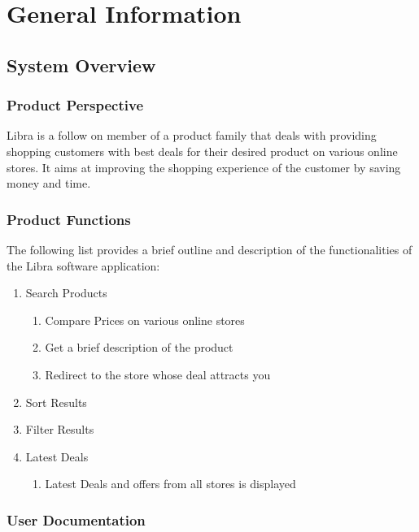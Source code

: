 \chapter{General Information}


\section{System Overview}

\subsection{Product Perspective}

Libra is a follow on member of a product family that deals with providing shopping customers with best deals for their desired product on various online stores. It aims at improving the shopping experience of the customer by saving money and time.

\subsection{Product Functions}

The following list provides a brief outline and description of the functionalities of the Libra software application:
\begin{enumerate}
     \item Search Products
     \begin{enumerate}
    	\item Compare Prices on various online stores
     	\item Get a brief description of the product
     	\item Redirect to the store whose deal attracts you
     \end{enumerate}
     \item Sort Results
     \item Filter Results
     \item Latest Deals
     \begin{enumerate}
    	\item Latest Deals and offers from all stores is displayed
     \end{enumerate}
\end{enumerate}

\subsection{User Documentation}

